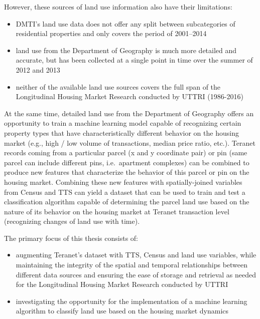 \vspace{5mm}

However, these sources of land use information also have their limitations:
\begin{itemize}
    \item DMTI's land use data does not offer any split between subcategories of residential properties and only covers the period of 2001--2014
    \item land use from the Department of Geography is much more detailed and accurate, but has been collected at a single point in time over the summer of 2012 and 2013
    \item neither of the available land use sources covers the full span of the Longitudinal Housing Market Research conducted by UTTRI (1986-2016)
\end{itemize}

At the same time, detailed land use from the Department of Geography offers an opportunity to train a machine learning model capable of recognizing certain property types that have characteristically different behavior on the housing market (e.g., high / low volume of transactions, median price ratio, etc.).
Teranet records coming from a particular parcel (x and y coordinate pair) or pin (same parcel can include different pins, i.e.\ apartment complexes) can be combined to produce new features that characterize the behavior of this parcel or pin on the housing market.
Combining these new features with spatially-joined variables from Census and TTS can yield a dataset that can be used to train and test a classification algorithm capable of determining the parcel land use based on the nature of its behavior on the housing market at Teranet transaction level (recognizing changes of land use with time).

\vspace{5mm}

The primary focus of this thesis consists of:

\begin{itemize}
    \item augmenting Teranet's dataset with TTS, Census and land use variables, while maintaining the integrity of the spatial and temporal relationships between different data sources and ensuring the ease of storage and retrieval as needed for the Longitudinal Housing Market Research conducted by UTTRI
    \item investigating the opportunity for the implementation of a machine learning algorithm to classify land use based on the housing market dynamics
\end{itemize}

